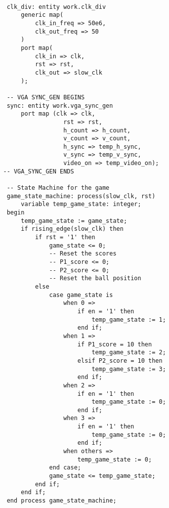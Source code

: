 \documentclass{article}
\begin{document}
\begin{lstlisting}[caption=State Machine, label=lst:state-machine]

	clk_div: entity work.clk_div
		generic map(
			clk_in_freq => 50e6,
			clk_out_freq => 50
		)
		port map(
			clk_in => clk,
			rst => rst,
			clk_out => slow_clk
		);

	-- VGA SYNC_GEN BEGINS
	sync: entity work.vga_sync_gen
		port map (clk => clk,
				    rst => rst,
				    h_count => h_count,
				    v_count => v_count,
				    h_sync => temp_h_sync,
					v_sync => temp_v_sync,
					video_on => temp_video_on);
   -- VGA_SYNC_GEN ENDS	

    -- State Machine for the game
    game_state_machine: process(slow_clk, rst)
        variable temp_game_state: integer;
    begin
        temp_game_state := game_state;
        if rising_edge(slow_clk) then
            if rst = '1' then
                game_state <= 0;
                -- Reset the scores
                -- P1_score <= 0; 
                -- P2_score <= 0;
                -- Reset the ball position
            else
                case game_state is
                    when 0 =>
                        if en = '1' then
                            temp_game_state := 1;
                        end if;
                    when 1 =>
                        if P1_score = 10 then
                            temp_game_state := 2;
                        elsif P2_score = 10 then
                            temp_game_state := 3;
                        end if;
                    when 2 =>
                        if en = '1' then
                            temp_game_state := 0;
                        end if;
                    when 3 =>
                        if en = '1' then
                            temp_game_state := 0;
                        end if;
                    when others =>
                        temp_game_state := 0;
                end case;
                game_state <= temp_game_state;
            end if;
        end if;
    end process game_state_machine;

\end{lstlisting}
\end{document}
